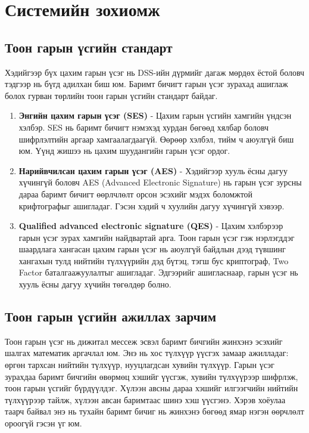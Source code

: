 \chapter{Системийн зохиомж}
\section{Тоон гарын үсгийн стандарт}
Хэдийгээр бүх цахим гарын үсэг нь DSS-ийн дүрмийг дагаж мөрдөх ёстой боловч тэдгээр нь бүгд адилхан биш юм. Баримт бичигт гарын үсэг зурахад ашиглаж болох гурван төрлийн тоон гарын үсгийн стандарт байдаг.
\begin{enumerate}
	\item \textbf{Энгийн цахим гарын үсэг (SES)} - Цахим гарын үсгийн хамгийн үндсэн хэлбэр. SES нь баримт бичигт нэмэхэд хурдан бөгөөд хялбар боловч шифрлэлтийн аргаар хамгаалагдаагүй. Өөрөөр хэлбэл, тийм ч аюулгүй биш юм. Үүнд жишээ нь цахим шуудангийн гарын үсэг ордог.
	\item \textbf{Нарийвчилсан цахим гарын үсэг (AES)} - Хэдийгээр хууль ёсны дагуу хүчингүй боловч AES (Advanced Electronic Signature) нь гарын үсэг зурсны дараа баримт бичигт өөрлчлөлт орсон эсэхийг мэдэх боломжтой крифтографыг ашигладаг. Гэсэн хэдий ч хуулийн дагуу хүчингүй хэвээр.
	\item \textbf{Qualified advanced electronic signature (QES)} - Цахим хэлбэрээр гарын үсэг зурах хамгийн найдвартай арга. Тоон гарын үсэг гэж нэрлэгддэг шаардлага хангасан цахим гарын үсэг нь аюулгүй байдлын дээд түвшинг хангахын тулд нийтийн түлхүүрийн дэд бүтэц, тэгш бус криптограф, Two Factor баталгаажуулалтыг ашигладаг. Эдгээрийг ашигласнаар, гарын үсэг нь хууль ёсны дагуу хүчийн төгөлдөр болно.
\end{enumerate}
\section[Ажиллах зарчим]{Тоон гарын үсгийн ажиллах зарчим}
Тоон гарын үсэг нь дижитал мессеж эсвэл баримт бичгийн жинхэнэ эсэхийг шалгах математик аргачлал юм. Энэ нь хос түлхүүр үүсгэх замаар ажилладаг: өргөн тархсан нийтийн түлхүүр, нууцлагдсан хувийн түлхүүр. Гарын үсэг зурахдаа баримт бичгийн өвөрмөц хэшийг үүсгэж, хувийн түлхүүрээр шифрлэж, тоон гарын үсгийг бүрдүүлдэг. Хүлээн авсны дараа хэшийг илгээгчийн нийтийн түлхүүрээр тайлж, хүлээн авсан баримтаас шинэ хэш үүсгэнэ. Хэрэв хоёулаа таарч байвал энэ нь тухайн баримт бичиг нь жинхэнэ бөгөөд ямар нэгэн өөрчлөлт ороогүй гэсэн үг юм.

